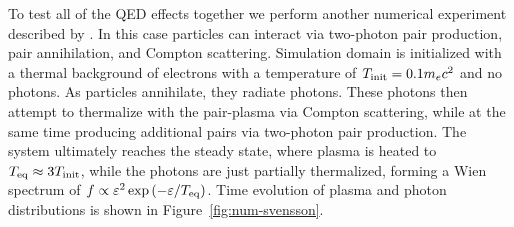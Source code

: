 \begin{figure}[htb]
\end{figure}

To test all of the QED effects together we perform another numerical experiment described by \cite{2020arXiv201107310B}. In this case particles can interact via two-photon pair production, pair annihilation, and Compton scattering. Simulation domain is initialized with a thermal background of electrons with a temperature of $T_{\rm init}=0.1 m_e c^2$ and no photons. As particles annihilate, they radiate photons. These photons then attempt to thermalize with the pair-plasma via Compton scattering, while at the same time producing additional pairs via two-photon pair production. The system ultimately reaches the steady state, where plasma is heated to $T_{\rm eq}\approx 3T_{\rm init}$, while the photons are just partially thermalized, forming a Wien spectrum of $f\propto \varepsilon^2\exp{(-\varepsilon/T_{\rm eq})}$. Time evolution of plasma and photon distributions is shown in Figure~\ref{fig:num-svensson}.


